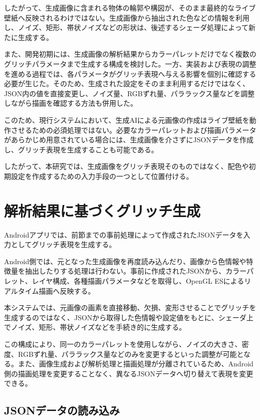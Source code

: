 したがって、生成画像に含まれる物体の輪郭や構図が、そのまま最終的なライブ壁紙へ反映されるわけではない。生成画像から抽出された色などの情報を利用し、ノイズ、矩形、帯状ノイズなどの形状は、後述するシェーダ処理によって新たに生成する。

また、開発初期には、生成画像の解析結果からカラーパレットだけでなく複数のグリッチパラメータまで生成する構成を検討した。一方、実装および表現の調整を進める過程では、各パラメータがグリッチ表現へ与える影響を個別に確認する必要が生じた。そのため、生成された設定をそのまま利用するだけではなく、JSON内の値を直接変更し、ノイズ量、RGBずれ量、パララックス量などを調整しながら描画を確認する方法も併用した。

このため、現行システムにおいて、生成AIによる元画像の作成はライブ壁紙を動作させるための必須処理ではない。必要なカラーパレットおよび描画パラメータがあらかじめ用意されている場合には、生成画像を介さずにJSONデータを作成し、グリッチ表現を生成することも可能である。

したがって、本研究では、生成画像をグリッチ表現そのものではなく、配色や初期設定を作成するための入力手段の一つとして位置付ける。


\section{解析結果に基づくグリッチ生成}

Androidアプリでは、前節までの事前処理によって作成されたJSONデータを入力としてグリッチ表現を生成する。

Android側では、元となった生成画像を再度読み込んだり、画像から色情報や特徴量を抽出したりする処理は行わない。事前に作成されたJSONから、カラーパレット、レイヤ構成、各種描画パラメータなどを取得し、OpenGL ESによるリアルタイム描画へ反映する。

本システムでは、元画像の画素を直接移動、欠損、変形させることでグリッチを生成するのではなく、JSONから取得した色情報や設定値をもとに、シェーダ上でノイズ、矩形、帯状ノイズなどを手続き的に生成する。

この構成により、同一のカラーパレットを使用しながら、ノイズの大きさ、密度、RGBずれ量、パララックス量などのみを変更するといった調整が可能となる。また、画像生成および解析処理と描画処理が分離されているため、Android側の描画処理を変更することなく、異なるJSONデータへ切り替えて表現を変更できる。


\subsection{JSONデータの読み込み}


